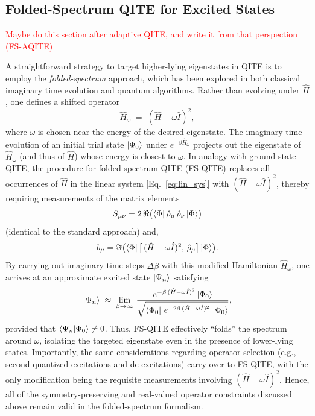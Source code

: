 \documentclass[aip,jcp,amsmath,amssymb, reprint]{revtex4-1}
\newcommand{\note}[2]{%
  \ifthenelse{\boolean{shownotes}}%
    {\textcolor{#1}{#2}}%
    {}%
}
\begin{document}
\subsection{Folded-Spectrum QITE for Excited States}
\note{red}{Maybe do this section after adaptive QITE, and write it from that perspection (FS-AQITE)}
A straightforward strategy to target higher-lying eigenstates in QITE is to employ the \textit{folded-spectrum} approach, which has been explored in both classical imaginary time evolution and quantum algorithms.\cite{Tsuchimochi2023Improved} Rather than evolving under $\hat{H}$, one defines a shifted operator
\begin{equation}
\hat{H}_\omega \;=\; (\hat{H} - \omega \hat{I})^2,
\end{equation}
where $\omega$ is chosen near the energy of the desired eigenstate.\cite{booth2012communication} The imaginary time evolution of an initial trial state $\ket{\Phi_0}$ under $e^{-\beta \hat{H}_\omega}$ projects out the eigenstate of $\hat{H}_\omega$ (and thus of $\hat{H}$) whose energy is closest to $\omega$. In analogy with ground-state QITE, the procedure for folded-spectrum QITE (FS-QITE) replaces all occurrences of $\hat{H}$ in the linear system [Eq.~\eqref{eq:lin_sys}] with $(\hat{H} - \omega \hat{I})^2$, thereby requiring measurements of the matrix elements
\begin{equation}
S_{\mu \nu} = 2\,\Re\bigl(\bra{\Phi} \hat{\rho}_\mu \,\hat{\rho}_\nu \ket{\Phi}\bigr)
\end{equation}
(identical to the standard approach) and,
\begin{equation}
b_{\mu} = \Im\bigl(\bra{\Phi} \bigl[\,(\hat{H}-\omega\hat{I})^2,\, \hat{\rho}_\mu\bigr]\ket{\Phi}\bigr).
\end{equation}
By carrying out imaginary time steps $\Delta \beta$ with this modified Hamiltonian $\hat{H}_\omega$, one arrives at an approximate excited state $\ket{\Psi_n}$ satisfying
\begin{equation}
\ket{\Psi_n} \;\approx\; \lim_{\beta\to\infty}\,\frac{e^{-\beta\,(\hat{H}-\omega\hat{I})^2}\ket{\Phi_0}}
{\sqrt{\bra{\Phi_0}\,e^{-2\beta\,(\hat{H}-\omega\hat{I})^2}\,\ket{\Phi_0}}},
\end{equation}
provided that $\braket{\Psi_n|\Phi_0}\neq 0$. Thus, FS-QITE effectively “folds” the spectrum around $\omega$, isolating the targeted eigenstate even in the presence of lower-lying states. Importantly, the same considerations regarding operator selection (e.g., second-quantized excitations and de-excitations) carry over to FS-QITE, with the only modification being the requisite measurements involving $(\hat{H}-\omega\hat{I})^2$. Hence, all of the symmetry-preserving and real-valued operator constraints discussed above remain valid in the folded-spectrum formalism.
\end{document}
